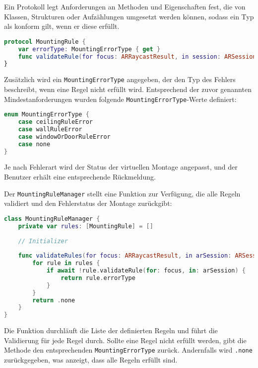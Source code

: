 \begin{tcolorbox}[colback=THAi-Blue!20!white, colframe=THAi-Blue]
    Ein Protokoll legt Anforderungen an Methoden und Eigenschaften fest, die von Klassen, Strukturen oder Aufzählungen umgesetzt werden können, sodass ein Typ als konform gilt, wenn er diese erfüllt. \cite{apple2025swift}
\end{tcolorbox}  

\begin{lstlisting}[language=Swift]
protocol MountingRule {
    var errorType: MountingErrorType { get }
    func validateRule(for focus: ARRaycastResult, in session: ARSession) async -> Bool
}
\end{lstlisting}

Zusätzlich wird ein \texttt{MountingErrorType} angegeben, der den Typ des Fehlers beschreibt, wenn eine Regel nicht erfüllt wird. Entsprechend der zuvor genannten Mindestanforderungen wurden folgende \texttt{MountingErrorType}-Werte definiert:

\begin{lstlisting}[language=Swift]
enum MountingErrorType {
    case ceilingRuleError
    case wallRuleError
    case windowOrDoorRuleError
    case none
}
\end{lstlisting}

Je nach Fehlerart wird der Status der virtuellen Montage angepasst, und der Benutzer erhält eine entsprechende Rückmeldung.

Der \texttt{MountingRuleManager} stellt eine Funktion zur Verfügung, die alle Regeln validiert und den Fehlerstatus der Montage zurückgibt:


\begin{lstlisting}[language=Swift]
class MountingRuleManager {
    private var rules: [MountingRule] = []
    
    // Initializer
    
    func validateRules(for focus: ARRaycastResult, in arSession: ARSession) async -> errorType: MountingErrorType {
        for rule in rules {
            if await !rule.validateRule(for: focus, in: arSession) {
                return rule.errorType
            }
        }
        return .none
    }
}
\end{lstlisting}

Die Funktion durchläuft die Liste der definierten Regeln und führt die Validierung für jede Regel durch. Sollte eine Regel nicht erfüllt werden, gibt die Methode den entsprechenden \texttt{MountingErrorType} zurück. Andernfalls wird \texttt{.none} zurückgegeben, was anzeigt, dass alle Regeln erfüllt sind.

